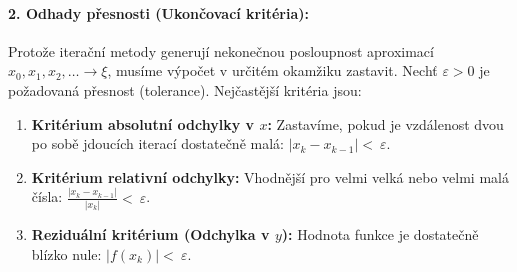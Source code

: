\paragraph*{2. Odhady přesnosti (Ukončovací kritéria):}
Protože iterační metody generují nekonečnou posloupnost aproximací $x_0, x_1, x_2, \dots \to \xi$, musíme výpočet v určitém okamžiku zastavit. Nechť $\varepsilon > 0$ je požadovaná přesnost (tolerance). Nejčastější kritéria jsou:
\begin{enumerate}
    \item \textbf{Kritérium absolutní odchylky v $x$:} Zastavíme, pokud je vzdálenost dvou po sobě jdoucích iterací dostatečně malá: $|x_k - x_{k-1}| <~\varepsilon$.
    \item \textbf{Kritérium relativní odchylky:} Vhodnější pro velmi velká nebo velmi malá čísla: $\frac{|x_k - x_{k-1}|}{|x_k|} <~\varepsilon$.
    \item \textbf{Reziduální kritérium (Odchylka v $y$):} Hodnota funkce je dostatečně blízko nule: $|f(x_k)| <~\varepsilon$. 
\end{enumerate}

